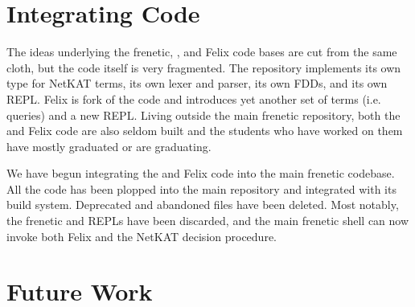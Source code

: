 \section{Integrating Code}
The ideas underlying the frenetic, \netauto{}, and Felix code bases are cut
from the same cloth, but the code itself is very fragmented. The \netauto{}
repository implements its own type for NetKAT terms, its own lexer and parser,
its own FDDs, and its own REPL. Felix is fork of the \netauto{} code and
introduces yet another set of terms (i.e. queries) and a new REPL. Living
outside the main frenetic repository, both the \netauto{} and Felix code are
also seldom built and the students who have worked on them have mostly
graduated or are graduating.

We have begun integrating the \netauto{} and Felix code into the main frenetic
codebase. All the code has been plopped into the main repository and integrated
with its build system. Deprecated and abandoned files have been deleted. Most
notably, the frenetic and \netauto{} REPLs have been discarded, and the main
frenetic shell can now invoke both Felix and the NetKAT decision procedure.

\section{Future Work}
